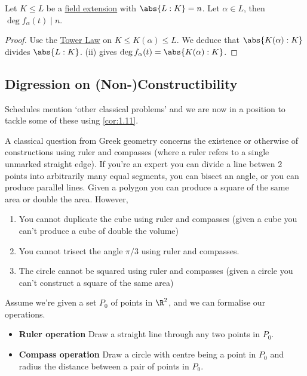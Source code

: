 \documentclass{article}
\begin{document}
\begin{ncor}\label{cor:1.11}
    Let $K \leq L$ be a \hyperlink{def:fieldExt}{field extension} with \hyperlink{def:degreeOfFieldExt}{$\abs{L:K} = n$}. Let $\alpha \in L$, then $\deg f_\alpha(t) \mid n$.
\end{ncor}

\begin{proof}
    Use the \hyperlink{thm:towerLaw}{Tower Law} on $K \leq K(\alpha) \leq L$.  We deduce that $\abs{K(\alpha):K}$ divides $\abs{L:K}$.  (ii) gives $\deg f_\alpha(t) = \abs{K(\alpha) : K}$.
\end{proof}

\subsection{Digression on (Non-)Constructibility}
Schedules mention `other classical problems' and we are now in a position to tackle some of these using \cref{cor:1.11}.

A classical question from Greek geometry concerns the existence or otherwise of constructions using ruler and compasses (where a ruler refers to a single unmarked straight edge).
If you're an expert you can divide a line betwen 2 points into arbitrarily many equal segments, you can bisect an angle, or you can produce parallel lines.
Given a polygon you can produce a square of the same area or double the area. However,
\begin{enumerate}
    \item You cannot duplicate the cube using ruler and compasses (given a cube you can't produce a cube of double the volume)
    \item You cannot trisect the angle $\pi/3$ using ruler and compasses.
    \item The circle cannot be squared using ruler and compasses (given a circle you can't construct a square of the same area)
\end{enumerate}
Assume we're given a set $P_0$ of points in $\R^2$, and we can formalise our operations.
\begin{itemize}[label={}, leftmargin=*]
    \item \textbf{Ruler operation} Draw a straight line through any two points in $P_0$.
    \item \textbf{Compass operation} Draw a circle with centre being a point in $P_0$ and radius the distance between a pair of points in $P_0$.
\end{itemize}
\end{document}
